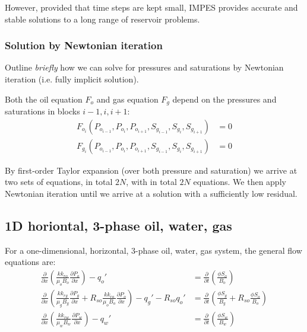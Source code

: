However, provided that time steps are kept small, IMPES provides accurate and stable solutions to a long range of reservoir problems.


\subsubsection{Solution by Newtonian iteration} %
\label{ssub:solution_by_newtonian_iteration}
\begin{question}
  Outline \emph{briefly} how we can solve for pressures and saturations by Newtonian iteration (i.e. fully implicit solution).
\end{question}

Both the oil equation $F_o$ and gas equation $F_g$ depend on the pressures and saturations in blocks $i-1,i,i+1$:
\begin{align}
    F_{o_i} \left( P_{o_{i-1}}, P_{o_i}, P_{o_{i+1}}, S_{g_{i-1}}, S_{g_i}, S_{g_{i+1}} \right) & = 0 \\
    F_{g_i} \left( P_{o_{i-1}}, P_{o_i}, P_{o_{i+1}}, S_{g_{i-1}}, S_{g_i}, S_{g_{i+1}} \right) & = 0
\end{align}

By first-order Taylor expansion (over both pressure and saturation) we arrive at two sets of equations, in total $2N$, with in total $2N$ equations. We then apply Newtonian iteration until we arrive at a solution with a sufficiently low residual.



\clearpage
\subsection{1D horiontal, 3-phase oil, water, gas} %
\label{sub:1d_horiontal_3_phase_oil_water_gas}

\begin{question}
  For a one-dimensional, horizontal, 3-phase oil, water, gas system, the general flow equations are:
  \begin{align}
    \frac{\partial}{\partial x}\left(\frac{kk_{ro}}{\mu_{o}B_{o}}\frac{\partial P_{o}}{\partial x}\right)-q_{o}'
    &=\frac{\partial}{\partial t}\left(\frac{\phi S_{o}}{B_{o}}\right) \\
    \frac{\partial}{\partial x}\left(\frac{kk_{rg}}{\mu_{g}B_{g}}\frac{\partial P_{g}}{\partial x}+R_{so}\frac{kk_{ro}}{\mu_{o}B_{o}}\frac{\partial P_{o}}{\partial x}\right)-q_{g}'-R_{so}q_{o}'
    &=\frac{\partial}{\partial t}\left(\frac{\phi S_{g}}{B_{g}}+R_{so}\frac{\phi S_{o}}{B_{o}}\right) \\
    \frac{\partial}{\partial x}\left(\frac{kk_{rw}}{\mu_{w}B_{w}}\frac{\partial P_{w}}{\partial x}\right)-q_{w}'
    &=\frac{\partial}{\partial t}\left(\frac{\phi S_{w}}{B_{w}}\right) \\
  \end{align}
\end{question}

